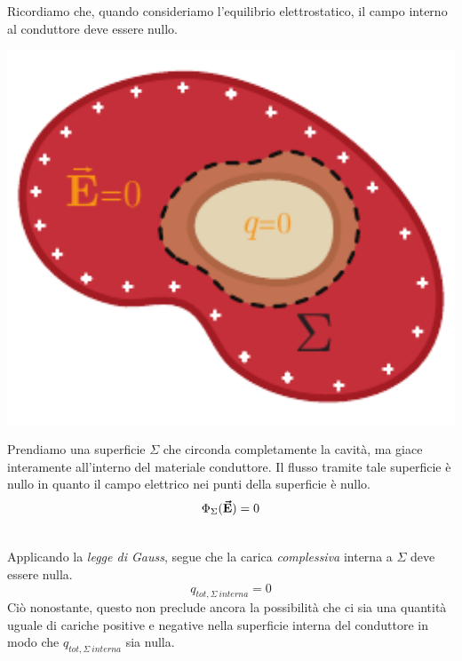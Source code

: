 \begin{demonstration}
	Ricordiamo che, quando consideriamo l'equilibrio elettrostatico, il campo interno al conduttore deve essere nullo.\\
\begin{minipage}{0.35\textwidth}
	\begin{center}
		\includegraphics[width=1\textwidth]{images/chp4condcavodim1.pdf}
	\end{center}
\end{minipage}\hspace{5pt}
\begin{minipage}{0.64\textwidth}
	Prendiamo una superficie $\Sigma$ che circonda completamente la cavità, ma giace interamente all'interno del materiale conduttore.
	Il flusso tramite tale superficie è nullo in quanto il campo elettrico nei punti della superficie è nullo.
	\begin{equation*}
		\Phi_{\Sigma}(\vb*{\va{E}})=0
	\end{equation*}
\end{minipage}\\
	Applicando la \textit{legge di Gauss}, segue che la carica \textit{complessiva} interna a $\Sigma$ deve essere nulla.
\begin{equation}
	q_{tot,\Sigma\ interna}=0
\end{equation}
Ciò nonostante, questo non preclude ancora la possibilità che ci sia una quantità uguale di cariche positive e negative nella superficie interna del conduttore in modo che	$q_{tot,\Sigma\ interna}$ sia nulla.\\

\end{demonstration}
